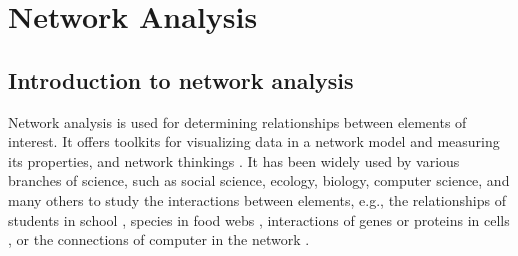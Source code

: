 \section*{Network Analysis}
\subsection*{Introduction to network analysis}

Network analysis is used for determining relationships between elements of interest. It offers toolkits for visualizing data in a network model and measuring its properties, and network thinkings \citep{PROULX:2005hx}. It has been widely used by various branches of science, such as social science, ecology, biology, computer science, and many others to study the interactions between elements, e.g., the relationships of students in school \citep{moody2001race}, species in food webs \citep{krause2003compartments}, interactions of genes or proteins in cells \citep{guimera2005functional}, or the connections of computer in the network \citep{pastor2001epidemic, newman2006modularity}.

